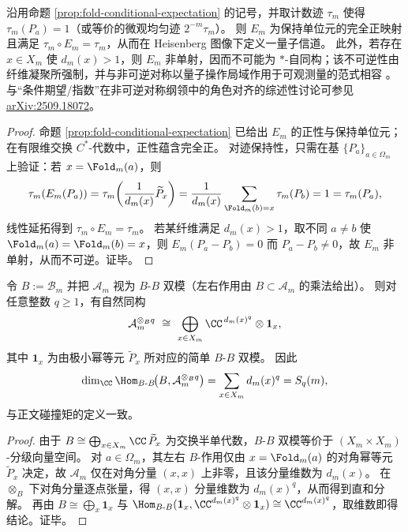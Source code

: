 \begin{theorem}\label{thm:conclusion-fold-condexp-quantum-operation-noninvertible}
沿用命题 \ref{prop:fold-conditional-expectation} 的记号，并取计数迹 \(\tau_m\) 使得 \(\tau_m(P_a)=1\)（或等价的微观均匀迹 \(2^{-m}\tau_m\)）。
则 \(E_m\) 为保持单位元的完全正映射且满足 \(\tau_m\circ E_m=\tau_m\)，从而在 Heisenberg 图像下定义一量子信道。
此外，若存在 \(x\in X_m\) 使 \(d_m(x)>1\)，则 \(E_m\) 非单射，因而不可能为 \(\ast\)-自同构；该不可逆性由纤维凝聚所强制，并与非可逆对称以量子操作局域作用于可观测量的范式相容 \cite{OkadaTachikawa2024NonInvertibleQuantumOperations,SchaferNameki2023ICTPLecturesNonInvertibleGeneralizedSymmetries}。
与“条件期望/指数”在非可逆对称纲领中的角色对齐的综述性讨论可参见 \href{https://arxiv.org/abs/2509.18072}{arXiv:2509.18072}。
\end{theorem}
\begin{proof}
命题 \ref{prop:fold-conditional-expectation} 已给出 \(E_m\) 的正性与保持单位元；在有限维交换 \(C^\ast\)-代数中，正性蕴含完全正。
对迹保持性，只需在基 \(\{P_a\}_{a\in\Omega_m}\) 上验证：若 \(x=\Fold_m(a)\)，则
\[
\tau_m(E_m(P_a))=\tau_m\!\left(\frac{1}{d_m(x)}\widetilde P_x\right)
=\frac{1}{d_m(x)}\sum_{\Fold_m(b)=x}\tau_m(P_b)=1=\tau_m(P_a),
\]
线性延拓得到 \(\tau_m\circ E_m=\tau_m\)。
若某纤维满足 \(d_m(x)>1\)，取不同 \(a\neq b\) 使 \(\Fold_m(a)=\Fold_m(b)=x\)，则
\(
E_m(P_a-P_b)=0
\)
而 \(P_a-P_b\neq 0\)，故 \(E_m\) 非单射，从而不可逆。证毕。
\end{proof}






\begin{proposition}\label{prop:conclusion-collision-moment-morita-defect-fusion}
令 \(B:=\mathcal{B}_m\) 并把 \(\mathcal{A}_m\) 视为 \(B\text{-}B\) 双模（左右作用由 \(B\subset\mathcal{A}_m\) 的乘法给出）。
则对任意整数 \(q\ge 1\)，有自然同构
\[
\mathcal{A}_m^{\otimes_{B} q}\ \cong\ \bigoplus_{x\in X_m}\CC^{\,d_m(x)^q}\otimes \mathbf{1}_x,
\]
其中 \(\mathbf{1}_x\) 为由极小幂等元 \(\widetilde P_x\) 所对应的简单 \(B\text{-}B\) 双模。
因此
\[
\dim_\CC \Hom_{B\text{-}B}\!\bigl(B,\mathcal{A}_m^{\otimes_B q}\bigr)
=\sum_{x\in X_m}d_m(x)^q
=S_q(m),
\]
与正文碰撞矩的定义一致。
\end{proposition}
\begin{proof}
由于 \(B\cong\bigoplus_{x\in X_m}\CC\,\widetilde P_x\) 为交换半单代数，\(B\text{-}B\) 双模等价于 \((X_m\times X_m)\)-分级向量空间。
对 \(a\in\Omega_m\)，其左右 \(B\)-作用仅由 \(x=\Fold_m(a)\) 的对角幂等元 \(\widetilde P_x\) 决定，故 \(\mathcal{A}_m\) 仅在对角分量 \((x,x)\) 上非零，且该分量维数为 \(d_m(x)\)。
在 \(\otimes_B\) 下对角分量逐点张量，得 \((x,x)\) 分量维数为 \(d_m(x)^q\)，从而得到直和分解。
再由 \(B\cong\bigoplus_x \mathbf{1}_x\) 与 \(\Hom_{B\text{-}B}(\mathbf{1}_x,\CC^{d_m(x)^q}\otimes \mathbf{1}_x)\cong \CC^{d_m(x)^q}\)，取维数即得结论。证毕。
\end{proof}

